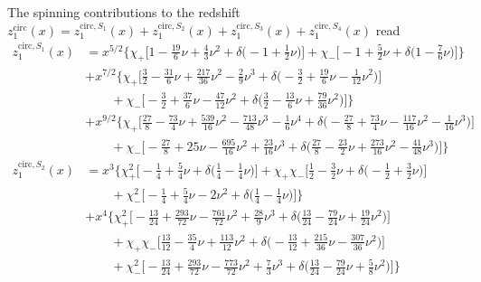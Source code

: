 \documentclass[prd,superscriptaddress,preprintnumbers,tightenlines,nofootinbib, eqsecnum]{revtex4-2}
\newcommand{\nn}{\nonumber}
\begin{document}
The spinning contributions to the redshift  $z_1^{\text{circ}}(x)=z_1^{\text{circ},S_1}(x) + z_1^{\text{circ},S_2}(x) + z_1^{\text{circ},S_3}(x) +z_1^{\text{circ},S_4}(x)$ read
\begin{subequations}
\begin{align}
z_1^{\text{circ},S_1}(x) &= x^{5/2}\Bigg\{\chi_{+}\Bigg[1 - \frac{19}{6} \nu + \frac{4}{3} \nu^{2} + \delta\Bigg(-1 + \frac{1}{2} \nu\Bigg)\Bigg] + \chi_{-}\Bigg[-1 + \frac{5}{2} \nu + \delta\Bigg(1 - \frac{7}{6} \nu\Bigg)\Bigg]\Bigg\} \nn \\
& + x^{7/2}\Bigg\{\chi_{+}\Bigg[\frac{3}{2} - \frac{31}{6} \nu + \frac{217}{36} \nu^{2} - \frac{2}{9} \nu^{3} + \delta\Bigg(-\frac{3}{2} + \frac{19}{6} \nu - \frac{1}{12} \nu^{2}\Bigg)\Bigg] \nn \\
&\qquad + \chi_{-}\Bigg[-\frac{3}{2} + \frac{37}{6} \nu - \frac{47}{12} \nu^{2} + \delta\Bigg(\frac{3}{2} - \frac{13}{6} \nu + \frac{79}{36} \nu^{2}\Bigg)\Bigg]\Bigg\} \nn \\
& + x^{9/2}\Bigg\{\chi_{+}\Bigg[\frac{27}{8} - \frac{73}{4} \nu + \frac{539}{16} \nu^{2} - \frac{713}{48} \nu^{3} - \frac{1}{6} \nu^{4} + \delta\Bigg(-\frac{27}{8} + \frac{73}{4} \nu - \frac{117}{16} \nu^{2} - \frac{1}{16} \nu^{3}\Bigg)\Bigg] \nn \\
&\qquad + \chi_{-}\Bigg[-\frac{27}{8} + 25 \nu - \frac{695}{16} \nu^{2} + \frac{23}{16} \nu^{3} + \delta\Bigg(\frac{27}{8} - \frac{23}{2} \nu + \frac{273}{16} \nu^{2} - \frac{41}{48} \nu^{3}\Bigg)\Bigg]\Bigg\} \\
z_1^{\text{circ},S_2}(x) &= x^{3}\Bigg\{\chi_{+}^2\Bigg[-\frac{1}{4} + \frac{5}{4} \nu + \delta\Bigg(\frac{1}{4} - \frac{1}{4} \nu\Bigg)\Bigg] + \chi_{+}\chi_{-}\Bigg[\frac{1}{2} - \frac{3}{2} \nu + \delta\Bigg(-\frac{1}{2} + \frac{3}{2} \nu\Bigg)\Bigg] \nn \\
&\qquad + \chi_{-}^2\Bigg[-\frac{1}{4} + \frac{5}{4} \nu - 2 \nu^{2} + \delta\Bigg(\frac{1}{4} - \frac{1}{4} \nu\Bigg)\Bigg]\Bigg\} \nn \\
& + x^{4}\Bigg\{\chi_{+}^2\Bigg[-\frac{13}{24} + \frac{293}{72} \nu - \frac{761}{72} \nu^{2} + \frac{28}{9} \nu^{3} + \delta\Bigg(\frac{13}{24} - \frac{79}{24} \nu + \frac{19}{24} \nu^{2}\Bigg)\Bigg] \nn \\
& \qquad + \chi_{+}\chi_{-}\Bigg[\frac{13}{12} - \frac{35}{4} \nu + \frac{113}{12} \nu^{2} + \delta\Bigg(-\frac{13}{12} + \frac{215}{36} \nu - \frac{307}{36} \nu^{2}\Bigg)\Bigg] \nn \\
& \qquad + \chi_{-}^2\Bigg[-\frac{13}{24} + \frac{293}{72} \nu - \frac{773}{72} \nu^{2} + \frac{7}{3} \nu^{3} + \delta\Bigg(\frac{13}{24} - \frac{79}{24} \nu + \frac{5}{8} \nu^{2}\Bigg)\Bigg]\Bigg\} \nn \\

\end{align}
\end{subequations}
\end{document}
